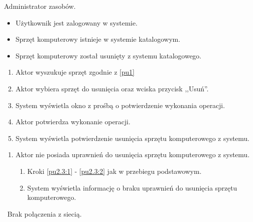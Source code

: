 Administrator zasobów.

\begin{itemize}
\item Użytkownik jest zalogowany w systemie.
\item Sprzęt komputerowy istnieje w systemie katalogowym.
\end{itemize}

\begin{itemize}
\item Sprzęt komputerowy został usunięty z systemu katalogowego.
\end{itemize}

\begin{enumerate}
\item \label{pu2.3:1} Aktor wyszukuje sprzęt zgodnie z \ref{pu1}
\item \label{pu2.3:2} Aktor wybiera sprzęt do usunięcia oraz wciska przycisk ,,Usuń''.
\item System wyświetla okno z prośbą o potwierdzenie wykonania operacji.
\item Aktor potwierdza wykonanie operacji.
\item System wyświetla potwierdzenie usunięcia sprzętu komputerowego z systemu.
\end{enumerate}

\begin{enumerate}
\item Aktor nie posiada uprawnień do usunięcia sprzętu komputerowego z systemu.
	\begin{enumerate}[label*=\arabic*.]
		\item Kroki \ref{pu2.3:1} - \ref{pu2.3:2} jak w przebiegu podstawowym.
		\item System wyświetla informację o braku uprawnień do usunięcia sprzętu komputerowego.
	\end{enumerate}
\end{enumerate}

\
Brak połączenia z siecią.

